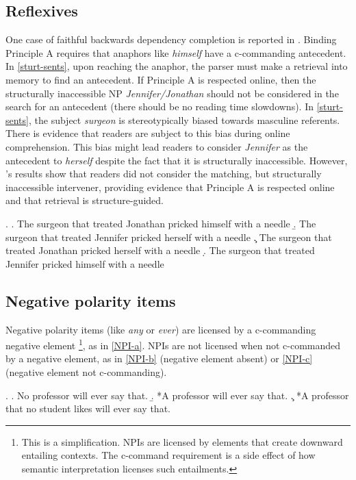 \subsection{Reflexives}

One case of faithful backwards dependency completion is reported in \citet{sturt03}. Binding Principle A \cite{chomsky81} requires that anaphors like \emph{himself} have a c-commanding antecedent. In \ref{sturt-sents}, upon reaching the anaphor, the parser must make a retrieval into memory to find an antecedent. If Principle A is respected online, then the structurally inaccessible NP \emph{Jennifer/Jonathan} should not be considered in the search for an antecedent (there should be no reading time slowdowns). In \ref{sturt-sents}, the subject \emph{surgeon} is stereotypically biased towards masculine referents. There is evidence that readers are subject to this bias during online comprehension. This bias might lead readers to consider \emph{Jennifer} as the antecedent to \emph{herself} despite the fact that it is structurally inaccessible. However, \citeauthor{sturt03}'s results show that readers did not consider the matching, but structurally inaccessible intervener, providing evidence that Principle A is respected online and that retrieval is structure-guided.

\ex. \label{sturt-sents} \a. The surgeon that treated Jonathan pricked himself with a needle \label{sturt-a}
      \b. The surgeon that treated Jennifer pricked herself with a needle \label{sturt-b}
      \c. The surgeon that treated Jonathan pricked herself with a needle \label{sturt-c}
      \d. The surgeon that treated Jennifer pricked himself with a needle \label{sturt-d}

\subsection{Negative polarity items}

Negative polarity items (like \emph{any} or \emph{ever}) are licensed by a c-commanding negative element \footnote{This is a simplification. NPIs are licensed by elements that create downward entailing contexts. The c-command requirement is a side effect of how semantic interpretation licenses such entailments.}, as in \ref{NPI-a}. NPIs are not licensed when not c-commanded by a negative element, as in \ref{NPI-b} (negative element absent) or \ref{NPI-c} (negative element not c-commanding).

\ex. \a. No professor will ever say that. \label{NPI-a}
     \b. *A professor will ever say that. \label{NPI-b}
     \c. *A professor that no student likes will ever say that. \label{NPI-c}
     

